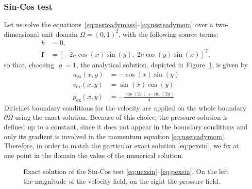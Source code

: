 \subsubsection{Sin-Cos test}
Let us solve the equations~\eqref{eq:nssteadymass}--\eqref{eq:nssteadymom} over 
a two-dimensional unit domain $\Omega=(0,1)^2$, with the following source terms:
\begin{align}
	h &= 0,\\
	\mathbf{f} &= [-2\nu \cos(x) \sin(y), \; 2\nu \cos(y) \sin(x)]^\mathrm{T},
\end{align}
so that, choosing $\varrho=1$, the analytical solution, depicted in 
Figure~\ref{fig:sincosexact}, is given by
\begin{align}
\label{eq:uexsin}	u_\text{ex}(x,y) &= -\cos(x)\sin(y)\\
	v_\text{ex}(x,y) &= \sin(x)\cos(y)\\
\label{eq:pexsin}	p_\text{ex}(x,y) &= -\frac{\cos(2x)+\sin(2y)}{4}
\end{align}
Dirichlet boundary conditions for the velocity are applied on the whole 
boundary $\partial \Omega$ using the exact solution. Because of this choice, 
the pressure solution is defined up to a constant, since it does not appear in 
the boundary conditions and only its gradient is involved in the momentum 
equation \eqref{eq:nssteadymom}. Therefore, in order to match the particular 
exact solution \eqref{eq:pexsin}, we fix at one point in the domain the value 
of the numerical solution.
\begin{figure}
	\centering
	\caption[Exact solution of the Sin-Cos test]{Exact solution of the Sin-Cos 
	test \eqref{eq:uexsin}--\eqref{eq:pexsin}. On the left the magnitude of the 
	velocity field, on the right the 
	pressure field.}
	\label{fig:sincosexact}
\end{figure}

